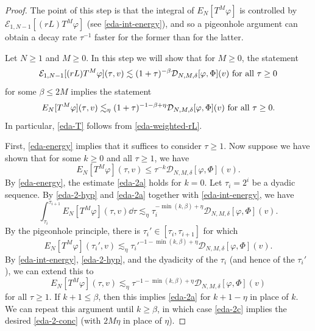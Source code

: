 \documentclass[10pt, reqno]{amsart}
\begin{document}
\begin{proof}
 The point of this step is that the
integral of \(E_N[T^M\varphi{}]\) is controlled by
\(\mathcal{E}_{1,N-1}[(rL)T^M\varphi{}]\) (see \cref{eda-int-energy}), and so a pigeonhole argument can
obtain a decay rate \(\tau^{-1}\) faster for the former than for the latter.

Let \(N\ge 1\) and \(M\ge 0\). In this step we will show that for \(M\ge 0\),
the statement
\begin{equation}\label{eda-2-hyp}
\mathcal{E}_{1,N-1}[(rL)T^M\varphi{}](\tau{},v)\lesssim (1+\tau{})^{-\beta{}}\mathcal{D}_{N,M,\delta{}}[\varphi{},\Phi{}](v)\textnormal{ for all }\tau{}\ge 0
\end{equation}
for some \(\beta{}\le 2M\) implies the statement
\begin{equation}\label{eda-2-conc}
E_N[T^M\varphi{}](\tau{},v)\lesssim_{\eta{}}(1 + \tau{})^{-1-\beta{}+\eta{}}\mathcal{D}_{N,M,\delta{}}[\varphi{},\Phi{}](v)\textnormal{ for all }\tau{}\ge 0.
\end{equation}
In particular, \cref{eda-T} follows from
\cref{eda-weighted-rL}.

First, \cref{eda-energy} implies that it suffices to
consider \(\tau{}\ge 1\). Now suppose we have shown that for some \(k\ge 0\) and all \(\tau{}\ge
1\), we have
\begin{equation}\label{eda-2a}
E_N[T^M\varphi{}](\tau{},v)\le \tau{}^{-k}\mathcal{D}_{N,M,\delta{}}[\varphi{},\Phi{}](v).
\end{equation}
By \cref{eda-energy}, the estimate
\cref{eda-2a} holds for \(k = 0\). Let \(\tau_i = 2^i\) be a dyadic sequence. By
\cref{eda-2-hyp} and \cref{eda-2a}
together with \cref{eda-int-energy}, we have
\begin{equation}
\int_{\tau{}_i}^{\tau{}_{i+1}} E_N[T^M\varphi{}](\tau{},v)\dd{}\tau{} \lesssim_\eta{} \tau{}_i^{-\min (k,\beta{})+\eta{}}\mathcal{D}_{N,M,\delta{}}[\varphi{},\Phi{}](v).
\end{equation}
By the pigeonhole principle, there is
\(\tau{}_i'\in [\tau{}_i,\tau{}_{i+1}]\) for which
\begin{equation}
E_N[T^M\varphi{}](\tau{}_i',v)\lesssim_\eta{} \tau{}_i'^{-1-\min (k,\beta{})+\eta{}}\mathcal{D}_{N,M,\delta{}}[\varphi{},\Phi{}](v).
\end{equation}
By \cref{eda-int-energy},
\cref{eda-2-hyp}, and the dyadicity of the \(\tau_i\) (and hence of the \(\tau{}_i'\)), we
can extend this to
\begin{equation}\label{eda-2c}
E_N[T^M\varphi{}](\tau{},v)\lesssim_\eta{} \tau{}^{-1-\min (k,\beta{})+\eta{}}\mathcal{D}_{N,M,\delta{}}[\varphi{},\Phi{}](v)
\end{equation}
for all \(\tau{}\ge 1\). If \(k+1\le \beta{}\), then this implies \cref{eda-2a} for \(k + 1-\eta{}\) in
place of \(k\). We can repeat this argument until \(k \ge \beta{}\), in which
case \cref{eda-2c} implies the desired \cref{eda-2-conc} (with \(2M\eta{}\) in place of
\(\eta{}\)).


\end{proof}
\end{document}
